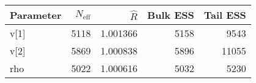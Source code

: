\begin{table}[!h]
\centering
\begin{tabular}{>{\raggedright\arraybackslash}p{2cm}rrrr}
\toprule
Parameter & $N_{\text{eff}}$ & $\widehat{R}$ & Bulk ESS & Tail ESS\\
\midrule
\rowcolor{gray!6}  v[1] & 5118 & 1.001366 & 5158 & 9543\\
v[2] & 5869 & 1.000838 & 5896 & 11055\\
\rowcolor{gray!6}  rho & 5022 & 1.000616 & 5032 & 5230\\
\bottomrule
\end{tabular}
\end{table}